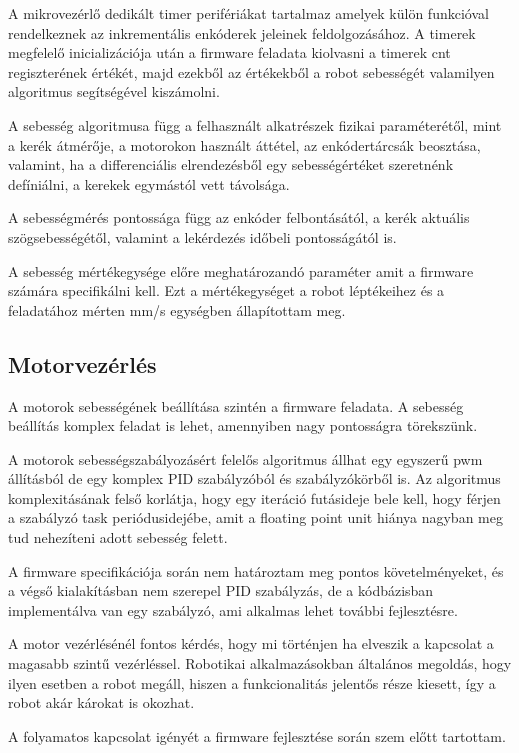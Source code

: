 A mikrovezérlő dedikált timer perifériákat tartalmaz amelyek külön funkcióval
rendelkeznek az inkrementális enkóderek jeleinek feldolgozásához. A timerek
megfelelő inicializációja után a firmware feladata kiolvasni a timerek cnt
regiszterének értékét, majd ezekből az értékekből a robot sebességét valamilyen
algoritmus segítségével kiszámolni.

A sebesség algoritmusa függ a felhasznált alkatrészek fizikai paraméterétől, mint
a kerék átmérője, a motorokon használt áttétel, az enkódertárcsák beosztása,
valamint, ha a differenciális elrendezésből egy sebességértéket szeretnénk
defíniálni, a kerekek egymástól vett távolsága.

A sebességmérés pontossága függ az enkóder felbontásától, a kerék aktuális
szögsebességétől, valamint a lekérdezés időbeli pontosságától is.

A sebesség mértékegysége előre meghatározandó paraméter amit a firmware számára
specifikálni kell. Ezt a mértékegységet a robot léptékeihez és a feladatához
mérten mm/s egységben állapítottam meg.

\subsection{Motorvezérlés}

A motorok sebességének beállítása szintén a firmware feladata. A sebesség
beállítás komplex feladat is lehet, amennyiben nagy pontosságra törekszünk.

A motorok sebességszabályozásért felelős algoritmus állhat egy egyszerű pwm
állításból de egy komplex PID szabályzóból és szabályzókörből is. Az algoritmus
komplexitásának felső korlátja, hogy egy iteráció futásideje bele kell, hogy
férjen a szabályzó task periódusidejébe, amit a floating point unit hiánya
nagyban meg tud nehezíteni adott sebesség felett.

A firmware specifikációja során nem határoztam meg pontos követelményeket, és a
végső kialakításban nem szerepel PID szabályzás, de a kódbázisban implementálva
van egy szabályzó, ami alkalmas lehet további fejlesztésre.

\medskip

A motor vezérlésénél fontos kérdés, hogy mi történjen ha elveszik a kapcsolat a
magasabb szintű vezérléssel. Robotikai alkalmazásokban általános megoldás, hogy
ilyen esetben a robot megáll, hiszen a funkcionalitás jelentős része kiesett, így
a robot akár károkat is okozhat.

A folyamatos kapcsolat igényét a firmware fejlesztése során szem előtt tartottam.

